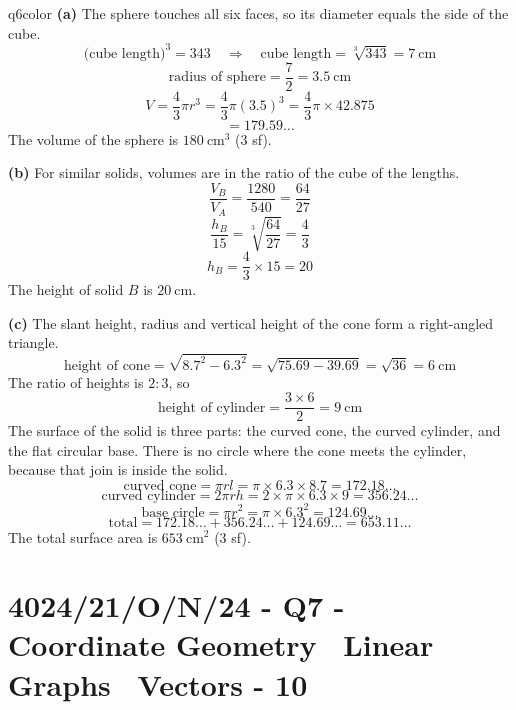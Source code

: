\documentclass[11pt,a4paper]{article}
\newcommand{\examq}[4]{\section[#1 - Q#2]{#1 - Q#2 - #3 - #4}}
\begin{document}
\begin{ansbox}{q6color}
\textbf{(a)} The sphere touches all six faces, so its diameter equals the side of the cube.
\[ \text{(cube length)}^3 = 343 \quad \Rightarrow \quad \text{cube length} = \sqrt[3]{343} = 7\ \mathrm{cm} \]
\[ \text{radius of sphere} = \frac{7}{2} = 3.5\ \mathrm{cm} \]
\[ V = \frac{4}{3}\pi r^3 = \frac{4}{3}\pi (3.5)^3 = \frac{4}{3}\pi \times 42.875 \]
\[ = 179.59\ldots \]
The volume of the sphere is $180\ \mathrm{cm^3}$ (3 sf).

\textbf{(b)} For similar solids, volumes are in the ratio of the cube of the lengths.
\[ \frac{V_B}{V_A} = \frac{1280}{540} = \frac{64}{27} \]
\[ \frac{h_B}{15} = \sqrt[3]{\frac{64}{27}} = \frac{4}{3} \]
\[ h_B = \frac{4}{3} \times 15 = 20 \]
The height of solid $B$ is $20\ \mathrm{cm}$.

\textbf{(c)} The slant height, radius and vertical height of the cone form a right-angled triangle.
\[ \text{height of cone} = \sqrt{8.7^2 - 6.3^2} = \sqrt{75.69 - 39.69} = \sqrt{36} = 6\ \mathrm{cm} \]
The ratio of heights is $2 : 3$, so
\[ \text{height of cylinder} = \frac{3 \times 6}{2} = 9\ \mathrm{cm} \]
The surface of the solid is three parts: the curved cone, the curved cylinder, and the flat circular base. There is no circle where the cone meets the cylinder, because that join is inside the solid.
\[ \text{curved cone} = \pi r l = \pi \times 6.3 \times 8.7 = 172.18\ldots \]
\[ \text{curved cylinder} = 2\pi r h = 2 \times \pi \times 6.3 \times 9 = 356.24\ldots \]
\[ \text{base circle} = \pi r^2 = \pi \times 6.3^2 = 124.69\ldots \]
\[ \text{total} = 172.18\ldots + 356.24\ldots + 124.69\ldots = 653.11\ldots \]
The total surface area is $653\ \mathrm{cm^2}$ (3 sf).
\end{ansbox}

\examq{4024/21/O/N/24}{7}{Coordinate Geometry \textperiodcentered\ Linear Graphs \textperiodcentered\ Vectors}{10}
\end{document}
